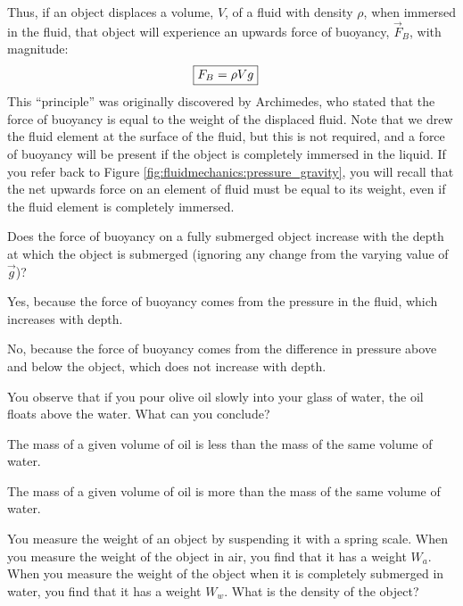 {{Thus, if an object displaces a volume, $V$, of a fluid with density $\rho$, when immersed in the fluid, that object will experience an upwards force of buoyancy, $\vec F_B$, with magnitude:
\begin{align}
\Aboxed{F_B = \rho V g}
\end{align} 
This ``principle'' was originally discovered by Archimedes, who stated that the force of buoyancy is equal to the weight of the displaced fluid. Note that we drew the fluid element at the surface of the fluid, but this is not required, and a force of buoyancy will be present if the object is completely immersed in the liquid. If you refer back to Figure \ref{fig:fluidmechanics:pressure_gravity}, you will recall that the net upwards force on an element of fluid must be equal to its weight, even if the fluid element is completely immersed.

\begin{checkpoint}
\begin{MCquestion}{Does the force of buoyancy on a fully submerged object increase with the depth at which the object is submerged (ignoring any change from the varying value of $\vec g$)?}
\item Yes, because the force of buoyancy comes from the pressure in the fluid, which increases with depth. 
\item No, because the force of buoyancy comes from the difference in pressure above and below the object, which does not increase with depth. \correct
\end{MCquestion}
\end{checkpoint}

\begin{checkpoint}
\begin{MCquestion}{You observe that if you pour olive oil slowly into your glass of water, the oil floats above the water. What can you conclude?}
\item The mass of a given volume of oil is less than the mass of the same volume of water. \correct
\item The mass of a given volume of oil is more than the mass of the same volume of water.  
\end{MCquestion}
\end{checkpoint}

\begin{example}{You measure the weight of an object by suspending it with a spring scale. When you measure the weight of the object in air, you find that it has a weight $W_{a}$. When you measure the weight of the object when it is completely submerged in water, you find that it has a weight $W_w$. What is the density of the object?}


\end{example}}}
